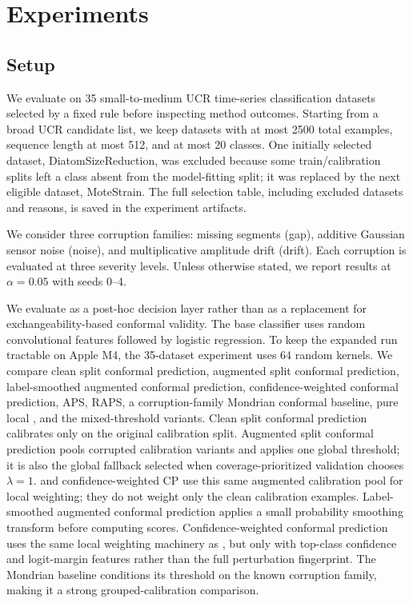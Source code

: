 \section{Experiments}

\subsection{Setup}

We evaluate on 35 small-to-medium UCR time-series classification datasets selected by a fixed rule before inspecting method outcomes. Starting from a broad UCR candidate list, we keep datasets with at most 2500 total examples, sequence length at most 512, and at most 20 classes. One initially selected dataset, DiatomSizeReduction, was excluded because some train/calibration splits left a class absent from the model-fitting split; it was replaced by the next eligible dataset, MoteStrain. The full selection table, including excluded datasets and reasons, is saved in the experiment artifacts.

We consider three corruption families: missing segments (gap), additive Gaussian sensor noise (noise), and multiplicative amplitude drift (drift). Each corruption is evaluated at three severity levels. Unless otherwise stated, we report results at $\alpha=0.05$ with seeds 0--4.

We evaluate \fastcp{} as a post-hoc decision layer rather than as a replacement for exchangeability-based conformal validity. The base classifier uses random convolutional features followed by logistic regression. To keep the expanded run tractable on Apple M4, the 35-dataset experiment uses 64 random kernels. We compare clean split conformal prediction, augmented split conformal prediction, label-smoothed augmented conformal prediction, confidence-weighted conformal prediction, APS, RAPS, a corruption-family Mondrian conformal baseline, pure local \fastcp, and the mixed-threshold \fastcp{} variants. Clean split conformal prediction calibrates only on the original calibration split. Augmented split conformal prediction pools corrupted calibration variants and applies one global threshold; it is also the global fallback selected when coverage-prioritized validation chooses $\lambda=1$. \fastcp{} and confidence-weighted CP use this same augmented calibration pool for local weighting; they do not weight only the clean calibration examples. Label-smoothed augmented conformal prediction applies a small probability smoothing transform before computing scores. Confidence-weighted conformal prediction uses the same local weighting machinery as \fastcp, but only with top-class confidence and logit-margin features rather than the full perturbation fingerprint. The Mondrian baseline conditions its threshold on the known corruption family, making it a strong grouped-calibration comparison.

